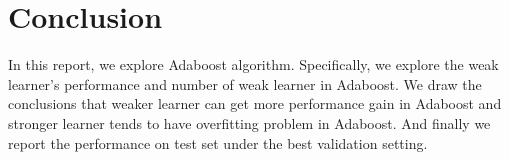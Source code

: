\documentclass[journal, a4paper]{IEEEtran}
\begin{document}
\section{Conclusion}
In this report, we explore Adaboost algorithm. Specifically, we explore the weak learner's performance and number of weak learner in Adaboost. We draw the conclusions that weaker learner can get more performance gain in Adaboost and stronger learner tends to have overfitting problem in Adaboost. And finally we report the performance on test set under the best validation setting. \par


\end{document}
